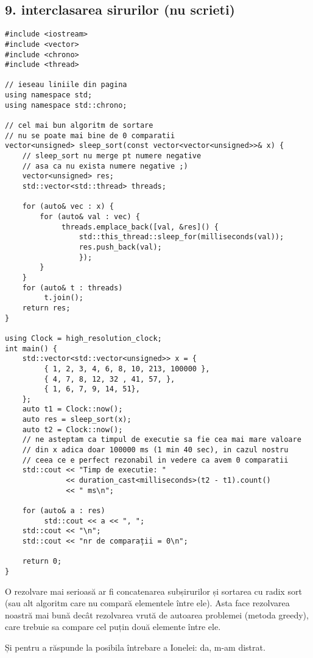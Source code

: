\documentclass[11pt]{article}
\begin{document}
\subsection*{9. interclasarea sirurilor (nu scrieti)}
\label{sec:orgdabcad7}
\begin{verbatim}
#include <iostream>
#include <vector>
#include <chrono>
#include <thread>

// ieseau liniile din pagina
using namespace std;
using namespace std::chrono;

// cel mai bun algoritm de sortare
// nu se poate mai bine de 0 comparatii
vector<unsigned> sleep_sort(const vector<vector<unsigned>>& x) {
    // sleep_sort nu merge pt numere negative
    // asa ca nu exista numere negative ;)
    vector<unsigned> res;
    std::vector<std::thread> threads;

    for (auto& vec : x) {
        for (auto& val : vec) {
             threads.emplace_back([val, &res]() {
                 std::this_thread::sleep_for(milliseconds(val));
                 res.push_back(val);
                 });
        }
    }
    for (auto& t : threads)
         t.join();
    return res;
}

using Clock = high_resolution_clock;
int main() {
    std::vector<std::vector<unsigned>> x = {
         { 1, 2, 3, 4, 6, 8, 10, 213, 100000 },
         { 4, 7, 8, 12, 32 , 41, 57, }, 
         { 1, 6, 7, 9, 14, 51},
    };
    auto t1 = Clock::now();
    auto res = sleep_sort(x);
    auto t2 = Clock::now();
    // ne asteptam ca timpul de executie sa fie cea mai mare valoare 
    // din x adica doar 100000 ms (1 min 40 sec), in cazul nostru
    // ceea ce e perfect rezonabil in vedere ca avem 0 comparatii
    std::cout << "Timp de executie: " 
              << duration_cast<milliseconds>(t2 - t1).count()
              << " ms\n";

    for (auto& a : res)
         std::cout << a << ", ";
    std::cout << "\n";
    std::cout << "nr de comparații = 0\n";

    return 0;
}
\end{verbatim}

O rezolvare mai serioasă ar fi concatenarea subșirurilor și sortarea cu radix sort (sau alt algoritm care nu compară elementele între ele). Asta face rezolvarea noastră mai bună decât rezolvarea vrută de autoarea problemei (metoda greedy), care trebuie sa compare cel puțin două elemente între ele.

\vfill
Și pentru a răspunde la posibila întrebare a Ionelei: da, m-am distrat.
\end{document}
